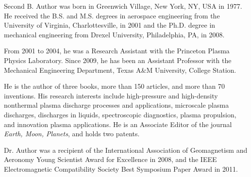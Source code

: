 \documentclass[journal,twoside,web]{ieeecolor2}
\begin{document}
\begin{IEEEbiography}{Second B.
Author} was born in Greenwich Village, New York, NY, USA in 
1977.
He received the B.S.
and M.S.
degrees in aerospace engineering from 
the University of Virginia, Charlottesville, in 2001 and the Ph.D.
degree in 
mechanical engineering from Drexel University, Philadelphia, PA, in 2008.

From 2001 to 2004, he was a Research Assistant with the Princeton Plasma 
Physics Laboratory.
Since 2009, he has been an Assistant Professor with the 
Mechanical Engineering Department, Texas A{\&}M University, College Station.

He is the author of three books, more than 150 articles, and more than 70 
inventions.
His research interests include high-pressure and high-density 
nonthermal plasma discharge processes and applications, microscale plasma 
discharges, discharges in liquids, spectroscopic diagnostics, plasma 
propulsion, and innovation plasma applications.
He is an Associate Editor of 
the journal \emph{Earth, Moon, Planets}, and holds two patents.


Dr.
Author was a recipient of the International Association of Geomagnetism 
and Aeronomy Young Scientist Award for Excellence in 2008, and the IEEE 
Electromagnetic Compatibility Society Best Symposium Paper Award in 2011.

\end{IEEEbiography}
\end{document}

